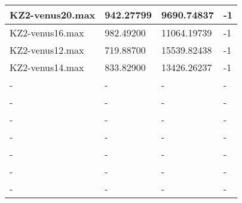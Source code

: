 \documentclass{article}
\begin{document}
\begin{table}
\begin{tabular}{|l|l|l|l|}
        KZ2-venus20.max & 942.27799 & 9690.74837 & -1 \\ \hline
        KZ2-venus16.max & 982.49200 & 11064.19739 & -1 \\ \hline
        KZ2-venus12.max & 719.88700 & 15539.82438 & -1 \\ \hline
        KZ2-venus14.max & 833.82900 & 13426.26237 & -1 \\ \hline
        - & - & - & - \\ \hline
        - & - & - & - \\ \hline
        - & - & - & - \\ \hline
        - & - & - & - \\ \hline
        - & - & - & - \\ \hline
        - & - & - & - \\ \hline
        - & - & - & - \\ \hline
    \end{tabular}
\end{table}
\end{document}

